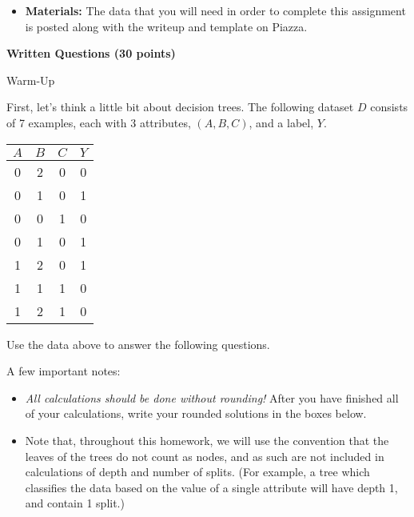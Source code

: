 \documentclass[11pt,addpoints,answers]{exam}
\begin{document}
\begin{itemize}
\begin{itemize}
  \end{itemize}

\item \textbf{Materials:} The data that you will need in order to complete this assignment is posted along with the writeup and template on Piazza.

\end{itemize}
\clearpage

{\LARGE \bf Written Questions (30 points)}
\begin{questions}
{\Large \question Warm-Up}

First, let's think a little bit about decision trees. The following dataset $D$ consists of 7 examples, each with 3 attributes, $(A,B,C)$, and a label, $Y$.

\begin{center}
\begin{tabular}{|c|c|c|c|}
\hline
$A$ & $B$ & $C$ & $Y$ \\ \hline
0 & 2 & 0 & 0     \\ \hline
0 & 1 & 0 & 1     \\ \hline
0 & 0 & 1 & 0     \\ \hline
0 & 1 & 0 & 1     \\ \hline
1 & 2 & 0 & 1     \\ \hline
1 & 1 & 1 & 0     \\ \hline
1 & 2 & 1 & 0     \\ \hline
\end{tabular}
\end{center}


Use the data above to answer the following questions. 

\begin{notebox}
A few important notes:
\begin{itemize}
    \item \emph{All calculations should be done without rounding!} After you have finished all of your calculations, write your rounded solutions in the boxes below.
    \item Note that, throughout this homework, we will use the convention that the leaves of the trees do not count as nodes, and as such are not included in calculations of depth and number of splits. (For example, a tree which classifies the data based on the value of a single attribute will have depth 1, and contain 1 split.)
\end{itemize}
\end{notebox}


\end{questions}
\end{document}
